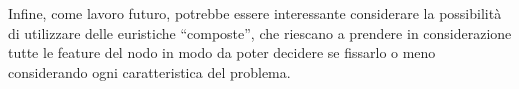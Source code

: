 
Infine, come lavoro futuro, potrebbe essere interessante considerare la possibilità di utilizzare delle euristiche ``composte'', che riescano a prendere in considerazione tutte le feature del nodo in modo da poter decidere se fissarlo o meno considerando ogni caratteristica del problema.